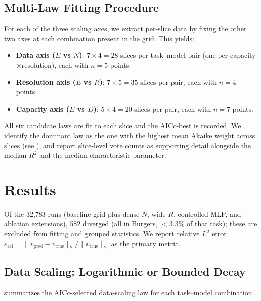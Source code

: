 \documentclass[11pt]{article}
\newcommand{\relLtwo}{\varepsilon_{\mathrm{rel}}}
\newcommand{\totalRuns}{32{,}783}
\begin{document}
\subsection{Multi-Law Fitting Procedure}
For each of the three scaling axes, we extract per-slice data by
fixing the other two axes at each combination present in the grid.
This yields:
\begin{itemize}
  \item \textbf{Data axis ($E$ vs $N$)}: $7 \times 4 = 28$ slices per
    task--model pair (one per capacity$\times$resolution), each with
    $n = 5$ points.
  \item \textbf{Resolution axis ($E$ vs $R$)}: $7 \times 5 = 35$
    slices per pair, each with $n = 4$ points.
  \item \textbf{Capacity axis ($E$ vs $D$)}: $5 \times 4 = 20$
    slices per pair, each with $n = 7$ points.
\end{itemize}
All six candidate laws are fit to each slice and the AICc-best is
recorded. We identify the dominant law as the one with the highest
mean Akaike weight across slices (see ), and
report slice-level vote counts as supporting detail alongside the
median $R^2$ and the median characteristic parameter.


\section{Results}
\label{sec:results}

Of the \totalRuns{} runs (baseline grid plus dense-$N$,
wide-$R$, controlled-MLP, and ablation extensions),
582 diverged (all in Burgers, $<$3.3\% of that task); these are
excluded from fitting and grouped statistics.
We report relative $L^2$ error
$\relLtwo = \|v_{\mathrm{pred}} - v_{\mathrm{true}}\|_2 /
\|v_{\mathrm{true}}\|_2$ as the primary metric.

\subsection{Data Scaling: Logarithmic or Bounded Decay}
\label{sec:data-scaling}

 summarizes the AICc-selected data-scaling law
for each task--model combination.
\end{document}
